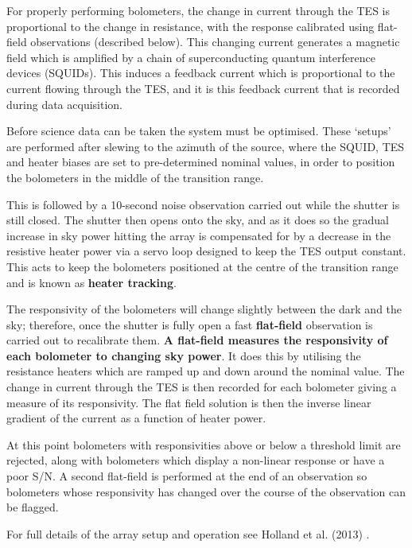 \documentclass[twoside,11pt]{article}
\renewcommand{\_}{\texttt{\symbol{95}}}
\begin{document}
For properly performing bolometers, the change in current through the
TES is proportional to the change in resistance, with the response
calibrated using flat-field observations (described below). This
changing current generates a magnetic field which is amplified by a
chain of superconducting quantum interference devices (SQUIDs). This
induces a feedback current which is proportional to the current
flowing through the TES, and it is this feedback current that is
recorded during data acquisition.

Before science data can be taken the system must be optimised. These
`setups' are performed after slewing to the azimuth of the source,
where the SQUID, TES and heater biases are set to pre-determined
nominal values, in order to position the bolometers in the middle of
the transition range.

This is followed by a 10-second noise observation carried out while
the shutter is still closed. The shutter then opens onto the sky, and
as it does so the gradual increase in sky power hitting the array is
compensated for by a decrease in the resistive heater power via a
servo loop designed to keep the TES output constant. This acts to keep
the bolometers positioned at the centre of the transition range and is
known as \textbf{heater tracking}.

The responsivity of the bolometers will change slightly between the
dark and the sky; therefore, once the shutter is fully open a fast
\textbf{flat-field} observation is carried out to recalibrate them.
\textbf{A flat-field measures the responsivity of each bolometer to
changing sky power}. It does this by utilising the resistance heaters
which are ramped up and down around the nominal value. The change in
current through the TES is then recorded for each bolometer giving a
measure of its responsivity. The flat field solution is then the
inverse linear gradient of the current as a function of heater power.

At this point bolometers with responsivities above or below a
threshold limit are rejected, along with bolometers which display a
non-linear response or have a poor S/N. A second flat-field is
performed at the end of an observation so bolometers whose
responsivity has changed over the course of the observation can be
flagged.

For full details of the array setup and operation see Holland et al.
(2013) \cite{s2main}.
\end{document}
